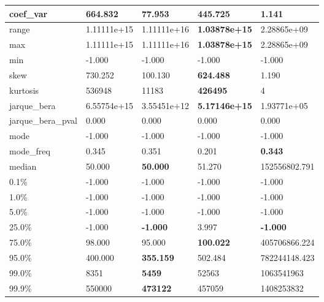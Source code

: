 \begin{table}[H]
\begin{tabular}{|l|m{10em}|m{10em}|m{10em}|m{10em}|}
\hline coef\_var & 664.832 & 77.953 & \bfseries 445.725 & \cellcolor[rgb]{0.9, 0.54, 0.52} 1.141 \\
\hline range & 1.11111e+15 & \cellcolor[rgb]{0.9, 0.54, 0.52} 1.11111e+16 & \bfseries 1.03878e+15 & 2.28865e+09 \\
\hline max & 1.11111e+15 & \cellcolor[rgb]{0.9, 0.54, 0.52} 1.11111e+16 & \bfseries 1.03878e+15 & 2.28865e+09 \\
\hline min & -1.000 & -1.000 & -1.000 & -1.000 \\
\hline skew & 730.252 & 100.130 & \bfseries 624.488 & \cellcolor[rgb]{0.9, 0.54, 0.52} 1.190 \\
\hline kurtosis & 536948 & 11183 & \bfseries 426495 & \cellcolor[rgb]{0.9, 0.54, 0.52} 4 \\
\hline jarque\_bera & 6.55754e+15 & 3.55451e+12 & \bfseries 5.17146e+15 & \cellcolor[rgb]{0.9, 0.54, 0.52} 1.93771e+05 \\
\hline jarque\_bera\_pval & 0.000 & 0.000 & 0.000 & 0.000 \\
\hline mode & -1.000 & -1.000 & -1.000 & -1.000 \\
\hline mode\_freq & 0.345 & 0.351 & \cellcolor[rgb]{0.9, 0.54, 0.52} 0.201 & \bfseries 0.343 \\
\hline median & 50.000 & \bfseries 50.000 & 51.270 & \cellcolor[rgb]{0.9, 0.54, 0.52} 152556802.791 \\
\hline 0.1\% & -1.000 & -1.000 & -1.000 & -1.000 \\
\hline 1.0\% & -1.000 & -1.000 & -1.000 & -1.000 \\
\hline 5.0\% & -1.000 & -1.000 & -1.000 & -1.000 \\
\hline 25.0\% & -1.000 & \bfseries -1.000 & \cellcolor[rgb]{0.9, 0.54, 0.52} 3.997 & \bfseries -1.000 \\
\hline 75.0\% & 98.000 & 95.000 & \bfseries 100.022 & \cellcolor[rgb]{0.9, 0.54, 0.52} 405706866.224 \\
\hline 95.0\% & 400.000 & \bfseries 355.159 & 502.484 & \cellcolor[rgb]{0.9, 0.54, 0.52} 782244148.423 \\
\hline 99.0\% & 8351 & \bfseries 5459 & 52563 & \cellcolor[rgb]{0.9, 0.54, 0.52} 1063541963 \\
\hline 99.9\% & 550000 & \bfseries 473122 & 457059 & \cellcolor[rgb]{0.9, 0.54, 0.52} 1408253832 \\
\hline
\end{tabular}
\end{table}
